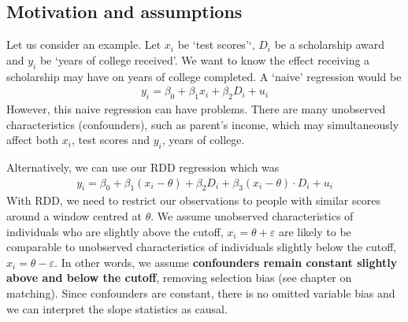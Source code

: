         \subsection{Motivation and assumptions}
            Let us consider an example. Let $x_i$ be `test scores'`, $D_i$ be a scholarship award and $y_i$ be `years of college received'. We want to know the effect receiving a scholarship may have on years of college completed. A `naive' regression would be
            \begin{align}
                y_i = \beta_0 +\beta_1 x_i +\beta_2 D_i + u_i
            \end{align}
            However, this naive regression can have problems. There are many unobserved characteristics (confounders), such as parent’s income, which may simultaneously affect both $x_i$, test scores and $y_i$, years of college.

            Alternatively, we can use our RDD regression which was
            \begin{align}
                y_i = \beta_0 + \beta_1 (x_i-\theta) + \beta_2 D_i + \beta_3 (x_i-\theta)\cdot D_i + u_i
            \end{align}
            With RDD, we need to restrict our observations to people with similar scores around a window centred at $\theta$. We assume unobserved characteristics of individuals who are slightly above the cutoff, $x_i = \theta + \varepsilon$ are likely to be comparable to unobserved characteristics of individuals slightly below the cutoff, $x_i = \theta - \varepsilon$. In other words, we assume \textbf{confounders remain constant slightly above and below the cutoff}, removing selection bias (see chapter on matching). Since confounders are constant, there is no omitted variable bias and we can interpret the slope statistics as causal.

